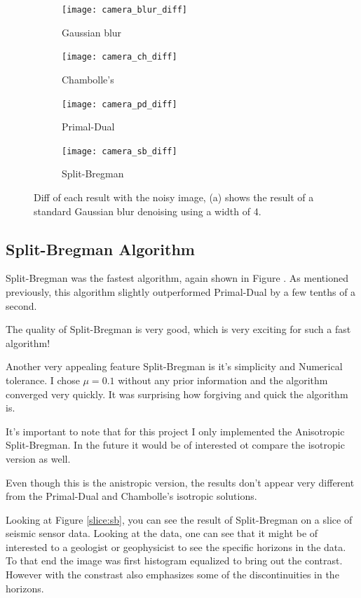 \documentclass[11pt]{article}
\begin{document}
\begin{figure}
\centering
\graphicspath{{images/}}
\begin{subfigure}[b]{0.4\textwidth}
\centering
\texttt{[image: camera\_blur\_diff]}
\caption{Gaussian blur}
\label{camera:gauss:diff}
\end{subfigure}
\begin{subfigure}[b]{0.4\textwidth}
\centering
\texttt{[image: camera\_ch\_diff]}
\caption{Chambolle's}
\label{camera:ch:diff}
\end{subfigure}
\begin{subfigure}[b]{0.4\textwidth}
\centering
\texttt{[image: camera\_pd\_diff]}
\caption{Primal-Dual}
\label{camera:pd:diff}
\end{subfigure}
\begin{subfigure}[b]{0.4\textwidth}
\centering
\texttt{[image: camera\_sb\_diff]}
\caption{Split-Bregman}
\label{camera:sb:diff}
\end{subfigure}
\caption{Diff of each result with the noisy image, (a) shows the result of a standard Gaussian blur denoising using a width of 4.}
\label{fig:cameraman:diff}
\end{figure}

\subsection{Split-Bregman Algorithm}

Split-Bregman was the fastest algorithm, again shown in Figure \cite{fig:timing}.
As mentioned previously, this algorithm slightly outperformed Primal-Dual by a few tenths of a second.

The quality of Split-Bregman is very good, which is very exciting for such a fast algorithm!

Another very appealing feature Split-Bregman is it's simplicity and Numerical tolerance. 
I chose $\mu=0.1$ without any prior information and the algorithm converged very quickly.
It was surprising how forgiving and quick the algorithm is.

It's important to note that for this project I only implemented the Anisotropic Split-Bregman.
In the future it would be of interested ot compare the isotropic version as well.

Even though this is the anistropic version, the results don't appear very different from the Primal-Dual and Chambolle's isotropic solutions.

Looking at Figure \ref{slice:sb}, you can see the result of Split-Bregman on a slice of seismic sensor data.
Looking at the data, one can see that it might be of interested to a geologist or geophysicist to see the specific horizons in the data.
To that end the image was first histogram equalized to bring out the contrast.
However with the constrast also emphasizes some of the discontinuities in the horizons.
\end{document}
